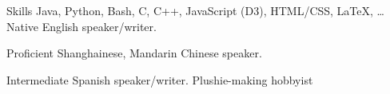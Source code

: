 
\begin{rubric}{Skills}
\entry*[Code]
	Java, Python, Bash, C, C++, JavaScript (D3), HTML/CSS, \LaTeX, \ldots
\entry*[Languages]
	Native English speaker/writer.
	\par Proficient Shanghainese, Mandarin Chinese speaker.
	\par Intermediate Spanish speaker/writer.
\entry*[Misc.]
    Plushie-making hobbyist
\end{rubric}
